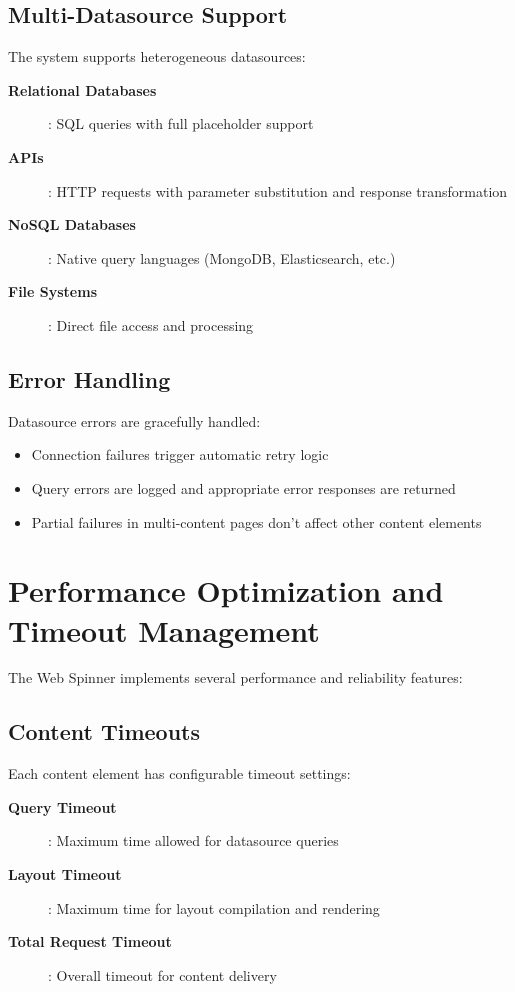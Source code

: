 \subsection{Multi-Datasource Support}

The system supports heterogeneous datasources:
\begin{description}
    \item[\textbf{Relational Databases}]: SQL queries with full \wbpl{} placeholder support
    \item[\textbf{\rest{} APIs}]: HTTP requests with parameter substitution and response transformation
    \item[\textbf{NoSQL Databases}]: Native query languages (MongoDB, Elasticsearch, etc.)
    \item[\textbf{File Systems}]: Direct file access and processing
\end{description}

\subsection{Error Handling}

Datasource errors are gracefully handled:
\begin{itemize}
    \item Connection failures trigger automatic retry logic
    \item Query errors are logged and appropriate error responses are returned
    \item Partial failures in multi-content pages don't affect other content elements
\end{itemize}

\section{Performance Optimization and Timeout Management}
\label{sec:performance-optimization}

The Web Spinner implements several performance and reliability features:

\subsection{Content Timeouts}

Each content element has configurable timeout settings:
\begin{description}
    \item[\textbf{Query Timeout}]: Maximum time allowed for datasource queries
    \item[\textbf{Layout Timeout}]: Maximum time for layout compilation and rendering
    \item[\textbf{Total Request Timeout}]: Overall timeout for content delivery
\end{description}

